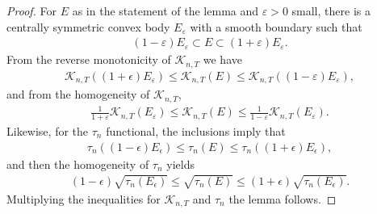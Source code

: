 \documentclass[reqno]{amsart}
\numberwithin{equation}{section}
\begin{document}
\begin{proof}

For $E$ as in the statement of the lemma and $\varepsilon>0$ small, there is a centrally symmetric convex body $E_\varepsilon$ with a smooth boundary such that 
\begin{align*}
(1-\varepsilon)E_\varepsilon \subset E \subset (1+\varepsilon) E_\varepsilon.    
\end{align*}
From the reverse monotonicity of $\mathcal{K}_{n,T}$ we have
\begin{align*}
\mathcal{K}_{n,T}((1+\epsilon)E_\varepsilon) \leq \mathcal{K}_{n,T}(E) \leq  \mathcal{K}_{n,T}((1-\varepsilon) E_\varepsilon), 
\end{align*}
and from the homogeneity of $\mathcal{K}_{n,T}$, 
\begin{align*}
  \frac{1}{1+\varepsilon}\mathcal{K}_{n,T}(E_\varepsilon) \leq \mathcal{K}_{n,T}(E) \leq \frac{1}{1-\varepsilon}\mathcal{K}_{n,T}(E_\varepsilon).    
\end{align*}
Likewise, for the $\tau_n$ functional, the inclusions imply that
\begin{align*}
  \tau_n((1-\epsilon)E_\epsilon) \leq \tau_n(E) \leq \tau_n((1+\epsilon)E_\epsilon),  
\end{align*}
and then the homogeneity of $\tau_n$ yields
\begin{align*}
  (1-\epsilon)\sqrt{\tau_n(E_\epsilon)} \leq \sqrt{\tau_n(E)} \leq (1+\epsilon)\sqrt{\tau_n(E_\epsilon)}.
\end{align*}
Multiplying the inequalities for $\mathcal{K}_{n,T}$ and $\tau_n$ the lemma follows.

\end{proof}
\end{document}
